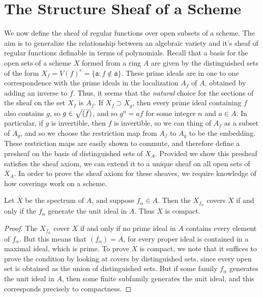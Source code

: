 \section{The Structure Sheaf of a Scheme}

We now define the sheaf of regular functions over open subsets of a scheme. The aim is to generalize the relationship between an algebraic variety and it's sheaf of regular functions definable in terms of polynomials. Recall that a basis for the open sets of a scheme $X$ formed from a ring $A$ are given by the distinguished sets of the form $X_f = V(f)^c = \{ \mathfrak{a}: f \not \in \mathfrak{a} \}$. These prime ideals are in one to one correspondence with the prime ideals in the localization $A_f$ of $A$, obtained by adding an inverse to $f$. Thus, it seems that the {\it natural} choice for the sections of the sheaf on the set $X_f$ is $A_f$. If $X_f \supset X_g$, then every prime ideal containing $f$ also contains $g$, so $g \in \smash{\sqrt{(f)}}$, and so $g^n = af$ for some integer $n$ and $a \in A$. In particular, if $g$ is invertible, then $f$ is invertible, so we can thing of $A_f$ as a subset of $A_g$, and so we choose the restriction map from $A_f$ to $A_g$ to be the embedding. These restriction maps are easily shown to commute, and therefore define a presheaf on the basis of distinguished sets of $X_A$. Provided we show this presheaf satisfies the sheaf axiom, we can extend it to a unique sheaf on all open sets of $X_A$. In order to prove the sheaf axiom for these sheaves, we require knowledge of how coverings work on a scheme.

\begin{lemma}
    Let $X$ be the spectrum of $A$, and suppose $f_\alpha \in A$. Then the $X_{f_\alpha}$ covers $X$ if and only if the $f_\alpha$ generate the unit ideal in $A$. Thus $X$ is compact.
\end{lemma}
\begin{proof}
    The $X_{f_\alpha}$ cover $X$ if and only if no prime ideal in $A$ contains every element of $f_\alpha$. But this means that $(f_\alpha) = A$, for every proper ideal is contained in a maximal ideal, which is prime. To prove $X$ is compact, we note that it suffices to prove the condition by looking at covers by distinguished sets, since every open set is obtained as the union of distinguished sets. But if some family $f_\alpha$ generates the unit ideal in $A$, then some finite subfamily generates the unit ideal, and this corresponds precisely to compactness.
\end{proof}

